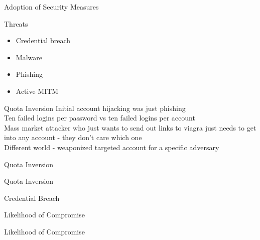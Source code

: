 \documentclass[nobackground,dvipsnames,table]{beamer}
\begin{document}
\begin{frame}{}
    
\end{frame}

\begin{frame}{Adoption of Security Measures}
    
\end{frame}

\begin{frame}{Threats}
    \begin{itemize}
        \item Credential breach
        \item Malware
        \item Phishing
        \item Active MITM
    \end{itemize}
\end{frame}

\begin{frame}{Quota Inversion}
    Initial account hijacking was just phishing \\
    Ten failed logins per password vs ten failed logins per account\\
    Mass market attacker who just wants to send out links to viagra just needs to get into any account - they don’t care which one\\

    Different world - weaponized targeted account for a specific adversary
\end{frame}

\begin{frame}{Quota Inversion}
    
\end{frame}

\begin{frame}{Quota Inversion}
    
\end{frame}

\begin{frame}{Credential Breach}
    
\end{frame}

\begin{frame}{Likelihood of Compromise}
    
\end{frame}

\begin{frame}{Likelihood of Compromise}
    
\end{frame}
\end{document}
